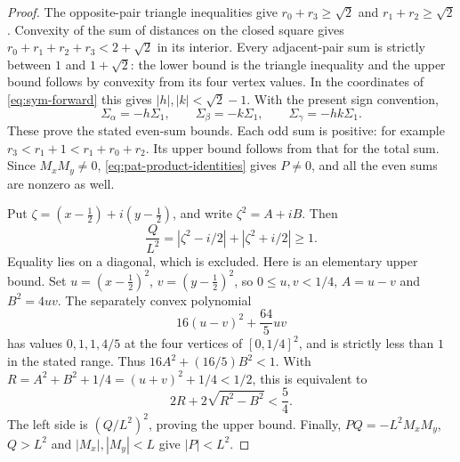 \begin{proof}
The opposite-pair triangle inequalities give
$r_0+r_3\geq\sqrt2$ and $r_1+r_2\geq\sqrt2$.
Convexity of the sum of distances on the closed square gives
$r_0+r_1+r_2+r_3<2+\sqrt2$ in its interior.
Every adjacent-pair sum is strictly between $1$ and $1+\sqrt2$:
the lower bound is the triangle inequality and the upper bound
follows by convexity from its four vertex values.  In the
coordinates of \eqref{eq:sym-forward} this gives
$|h|,|k|<\sqrt2-1$.  With the present sign convention,
\[
 \Sigma_\alpha=-h\Sigma_1,\qquad
 \Sigma_\beta=-k\Sigma_1,\qquad
 \Sigma_\gamma=-hk\Sigma_1.
\]
These prove the stated even-sum bounds.  Each odd sum is positive:
for example $r_3<r_1+1<r_1+r_0+r_2$.
Its upper bound follows from that for the total sum.
Since $M_xM_y\ne0$, \eqref{eq:pat-product-identities} gives
$P\ne0$, and all the even sums are nonzero as well.

Put $\zeta=(x-\tfrac12)+i(y-\tfrac12)$, and write
$\zeta^2=A+iB$.  Then
\[
 \frac Q{L^2}=|\zeta^2-i/2|+|\zeta^2+i/2|\geq1.
\]
Equality lies on a diagonal, which is excluded.  Here is an
elementary upper bound.  Set
$u=(x-\tfrac12)^2$, $v=(y-\tfrac12)^2$, so
$0\leq u,v<1/4$, $A=u-v$ and $B^2=4uv$.
The separately convex polynomial
\[
 16(u-v)^2+\frac{64}{5}uv
\]
has values $0,1,1,4/5$ at the four vertices of
$[0,1/4]^2$, and is strictly less than $1$ in the stated range.
Thus $16A^2+(16/5)B^2<1$.  With
$R=A^2+B^2+1/4=(u+v)^2+1/4<1/2$, this is equivalent to
\[
 2R+2\sqrt{R^2-B^2}<\frac54.
\]
The left side is $(Q/L^2)^2$, proving the upper bound.
Finally, $PQ=-L^2M_xM_y$, $Q>L^2$ and $|M_x|,|M_y|<L$
give $|P|<L^2$.
\end{proof}

